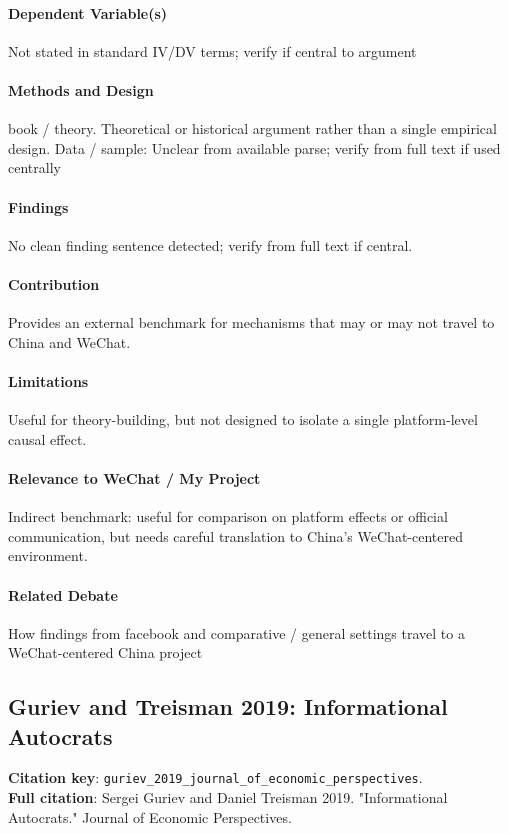 \documentclass[12pt]{article}
\begin{document}
\paragraph{Dependent Variable(s)} Not stated in standard IV/DV terms; verify if central to argument

\paragraph{Methods and Design} book / theory. Theoretical or historical argument rather than a single empirical design. Data / sample: Unclear from available parse; verify from full text if used centrally

\paragraph{Findings} No clean finding sentence detected; verify from full text if central.

\paragraph{Contribution} Provides an external benchmark for mechanisms that may or may not travel to China and WeChat.

\paragraph{Limitations} Useful for theory-building, but not designed to isolate a single platform-level causal effect.

\paragraph{Relevance to WeChat / My Project} Indirect benchmark: useful for comparison on platform effects or official communication, but needs careful translation to China's WeChat-centered environment.

\paragraph{Related Debate} How findings from facebook and comparative / general settings travel to a WeChat-centered China project


\subsection{Guriev and Treisman 2019: Informational Autocrats}
\textbf{Citation key}: \texttt{guriev\_2019\_journal\_of\_economic\_perspectives}.\\
\textbf{Full citation}: Sergei Guriev and Daniel Treisman 2019. "Informational Autocrats." Journal of Economic Perspectives.
\end{document}
